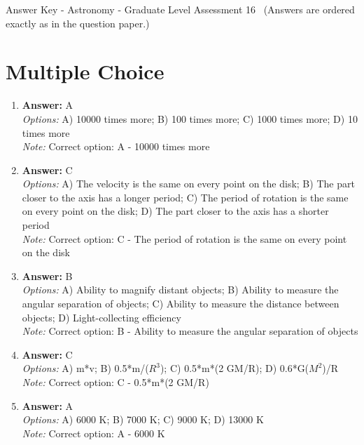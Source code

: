 \documentclass[12pt]{article}
\begin{document}
\begin{center}
Answer Key - Astronomy - Graduate Level Assessment 16 \
\small (Answers are ordered exactly as in the question paper.)
\end{center}

\section*{Multiple Choice}
\begin{enumerate}[label=\arabic*.]
\item \textbf{Answer:} A
\\ \textit{Options:} A) 10000 times more; B) 100 times more; C) 1000 times more; D) 10 times more
\\ \textit{Note:} Correct option: A - 10000 times more
\item \textbf{Answer:} C
\\ \textit{Options:} A) The velocity is the same on every point on the disk; B) The part closer to the axis has a longer period; C) The period of rotation is the same on every point on the disk; D) The part closer to the axis has a shorter period
\\ \textit{Note:} Correct option: C - The period of rotation is the same on every point on the disk
\item \textbf{Answer:} B
\\ \textit{Options:} A) Ability to magnify distant objects; B) Ability to measure the angular separation of objects; C) Ability to measure the distance between objects; D) Light-collecting efficiency
\\ \textit{Note:} Correct option: B - Ability to measure the angular separation of objects
\item \textbf{Answer:} C
\\ \textit{Options:} A) m*v; B) 0.5*m/($R^3$); C) 0.5*m*(2 GM/R); D) 0.6*G($M^2$)/R
\\ \textit{Note:} Correct option: C - 0.5*m*(2 GM/R)
\item \textbf{Answer:} A
\\ \textit{Options:} A) 6000 K; B) 7000 K; C) 9000 K; D) 13000 K
\\ \textit{Note:} Correct option: A - 6000 K
\end{enumerate}
\end{document}

